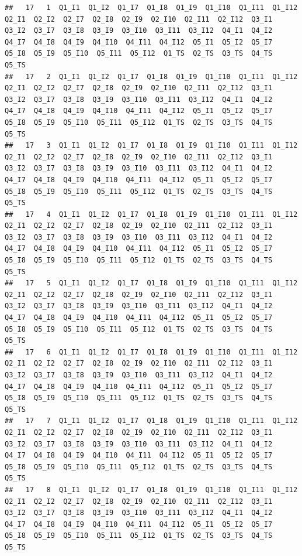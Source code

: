 \documentclass[]{book}
\begin{document}
\begin{verbatim}
##   17   1  Q1_I1  Q1_I2  Q1_I7  Q1_I8  Q1_I9  Q1_I10  Q1_I11  Q1_I12  Q2_I1  Q2_I2  Q2_I7  Q2_I8  Q2_I9  Q2_I10  Q2_I11  Q2_I12  Q3_I1  Q3_I2  Q3_I7  Q3_I8  Q3_I9  Q3_I10  Q3_I11  Q3_I12  Q4_I1  Q4_I2  Q4_I7  Q4_I8  Q4_I9  Q4_I10  Q4_I11  Q4_I12  Q5_I1  Q5_I2  Q5_I7  Q5_I8  Q5_I9  Q5_I10  Q5_I11  Q5_I12  Q1_TS  Q2_TS  Q3_TS  Q4_TS  Q5_TS
##   17   2  Q1_I1  Q1_I2  Q1_I7  Q1_I8  Q1_I9  Q1_I10  Q1_I11  Q1_I12  Q2_I1  Q2_I2  Q2_I7  Q2_I8  Q2_I9  Q2_I10  Q2_I11  Q2_I12  Q3_I1  Q3_I2  Q3_I7  Q3_I8  Q3_I9  Q3_I10  Q3_I11  Q3_I12  Q4_I1  Q4_I2  Q4_I7  Q4_I8  Q4_I9  Q4_I10  Q4_I11  Q4_I12  Q5_I1  Q5_I2  Q5_I7  Q5_I8  Q5_I9  Q5_I10  Q5_I11  Q5_I12  Q1_TS  Q2_TS  Q3_TS  Q4_TS  Q5_TS
##   17   3  Q1_I1  Q1_I2  Q1_I7  Q1_I8  Q1_I9  Q1_I10  Q1_I11  Q1_I12  Q2_I1  Q2_I2  Q2_I7  Q2_I8  Q2_I9  Q2_I10  Q2_I11  Q2_I12  Q3_I1  Q3_I2  Q3_I7  Q3_I8  Q3_I9  Q3_I10  Q3_I11  Q3_I12  Q4_I1  Q4_I2  Q4_I7  Q4_I8  Q4_I9  Q4_I10  Q4_I11  Q4_I12  Q5_I1  Q5_I2  Q5_I7  Q5_I8  Q5_I9  Q5_I10  Q5_I11  Q5_I12  Q1_TS  Q2_TS  Q3_TS  Q4_TS  Q5_TS
##   17   4  Q1_I1  Q1_I2  Q1_I7  Q1_I8  Q1_I9  Q1_I10  Q1_I11  Q1_I12  Q2_I1  Q2_I2  Q2_I7  Q2_I8  Q2_I9  Q2_I10  Q2_I11  Q2_I12  Q3_I1  Q3_I2  Q3_I7  Q3_I8  Q3_I9  Q3_I10  Q3_I11  Q3_I12  Q4_I1  Q4_I2  Q4_I7  Q4_I8  Q4_I9  Q4_I10  Q4_I11  Q4_I12  Q5_I1  Q5_I2  Q5_I7  Q5_I8  Q5_I9  Q5_I10  Q5_I11  Q5_I12  Q1_TS  Q2_TS  Q3_TS  Q4_TS  Q5_TS
##   17   5  Q1_I1  Q1_I2  Q1_I7  Q1_I8  Q1_I9  Q1_I10  Q1_I11  Q1_I12  Q2_I1  Q2_I2  Q2_I7  Q2_I8  Q2_I9  Q2_I10  Q2_I11  Q2_I12  Q3_I1  Q3_I2  Q3_I7  Q3_I8  Q3_I9  Q3_I10  Q3_I11  Q3_I12  Q4_I1  Q4_I2  Q4_I7  Q4_I8  Q4_I9  Q4_I10  Q4_I11  Q4_I12  Q5_I1  Q5_I2  Q5_I7  Q5_I8  Q5_I9  Q5_I10  Q5_I11  Q5_I12  Q1_TS  Q2_TS  Q3_TS  Q4_TS  Q5_TS
##   17   6  Q1_I1  Q1_I2  Q1_I7  Q1_I8  Q1_I9  Q1_I10  Q1_I11  Q1_I12  Q2_I1  Q2_I2  Q2_I7  Q2_I8  Q2_I9  Q2_I10  Q2_I11  Q2_I12  Q3_I1  Q3_I2  Q3_I7  Q3_I8  Q3_I9  Q3_I10  Q3_I11  Q3_I12  Q4_I1  Q4_I2  Q4_I7  Q4_I8  Q4_I9  Q4_I10  Q4_I11  Q4_I12  Q5_I1  Q5_I2  Q5_I7  Q5_I8  Q5_I9  Q5_I10  Q5_I11  Q5_I12  Q1_TS  Q2_TS  Q3_TS  Q4_TS  Q5_TS
##   17   7  Q1_I1  Q1_I2  Q1_I7  Q1_I8  Q1_I9  Q1_I10  Q1_I11  Q1_I12  Q2_I1  Q2_I2  Q2_I7  Q2_I8  Q2_I9  Q2_I10  Q2_I11  Q2_I12  Q3_I1  Q3_I2  Q3_I7  Q3_I8  Q3_I9  Q3_I10  Q3_I11  Q3_I12  Q4_I1  Q4_I2  Q4_I7  Q4_I8  Q4_I9  Q4_I10  Q4_I11  Q4_I12  Q5_I1  Q5_I2  Q5_I7  Q5_I8  Q5_I9  Q5_I10  Q5_I11  Q5_I12  Q1_TS  Q2_TS  Q3_TS  Q4_TS  Q5_TS
##   17   8  Q1_I1  Q1_I2  Q1_I7  Q1_I8  Q1_I9  Q1_I10  Q1_I11  Q1_I12  Q2_I1  Q2_I2  Q2_I7  Q2_I8  Q2_I9  Q2_I10  Q2_I11  Q2_I12  Q3_I1  Q3_I2  Q3_I7  Q3_I8  Q3_I9  Q3_I10  Q3_I11  Q3_I12  Q4_I1  Q4_I2  Q4_I7  Q4_I8  Q4_I9  Q4_I10  Q4_I11  Q4_I12  Q5_I1  Q5_I2  Q5_I7  Q5_I8  Q5_I9  Q5_I10  Q5_I11  Q5_I12  Q1_TS  Q2_TS  Q3_TS  Q4_TS  Q5_TS

\end{verbatim}
\end{document}
